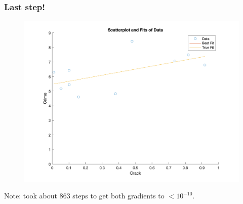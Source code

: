 \documentclass{beamer}
\begin{document}
\begin{frame}
\frametitle[alignment=center]{Last step!}
\begin{figure}
\centering
\includegraphics[scale=0.5]{Newton_OLS_Figure_30.png}
\end{figure}
Note: took about 863 steps to get both gradients to $<10^{-10}$.
\end{frame}


\end{document}
